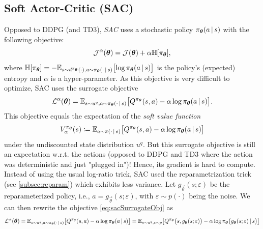 		\subsection{Soft Actor-Critic (\acs{SAC})}
			Opposed to \ac{DDPG} (and \ac{TD3}), \emph{\ac{SAC}} uses a stochastic policy \(\pi_{\bm{\theta}}(a \,\vert\, s)\) with the following objective:
			\begin{equation}
				\mathcal{J}^\alpha(\bm{\theta}) = \mathcal{J}(\bm{\theta}) + \alpha \mathbb{H}[\pi_{\bm{\theta}}],
			\end{equation}
			where \( \mathbb{H}[\pi_{\bm{\theta}}] = -\mathbb{E}_{s \sim d^{\pi_{\bm{\theta}}}(\cdot), a \sim \pi_{\bm{\theta}}(\cdot \,\vert\, s)}\bigl[ \log \pi_{\bm{\theta}}(a \,\vert\, s) \bigr] \) is the policy's (expected) entropy and \(\alpha\) is a hyper-parameter. As this objective is very difficult to optimize, \ac{SAC} uses the surrogate objective
			\begin{equation}
				\mathcal{L}^\alpha(\bm{\theta}) = \mathbb{E}_{s \sim u^q, a \sim \pi_{\bm{\theta}}(\cdot \,\vert\, s)}\bigl[ Q^{\pi_{\bm{\theta}}}(s, a) - \alpha \log \pi_{\bm{\theta}}(a \,\vert\, s) \bigr].  \label{eq:sacSurrogateObj}
			\end{equation}
			This objective equals the expectation of the \emph{soft value function}
			\begin{equation}
				V^{\pi_{\bm{\theta}}}_\alpha(s) \coloneqq \mathbb{E}_{a \sim \pi(\cdot \,\vert\, s)}\bigl[ Q^{\pi_{\bm{\theta}}}(s, a) - \alpha \log \pi_{\bm{\theta}}(a \,\vert\, s) \bigr]
			\end{equation}
			under the undiscounted state distribution \(u^q\). But this surrogate objective is still an expectation w.r.t. the actions (opposed to \ac{DDPG} and \ac{TD3} where the action was deterministic and just "plugged in")! Hence, its gradient is hard to compute. Instead of using the usual log-ratio trick, \ac{SAC} used the reparametrization trick (see \autoref{subsec:reparam}) which exhibits less variance. Let \( g_{\vec{\theta}}(s; \varepsilon) \) be the reparameterized policy, i.e., \( a = g_{\vec{\theta}}(s; \varepsilon) \), with \( \varepsilon \sim p(\cdot) \) being the noise. We can then rewrite the objective \eqref{eq:sacSurrogateObj} as
			\begin{equation}
				\mathcal{L}^\alpha(\bm{\theta})
					= \mathbb{E}_{s \sim u^q, a \sim \pi_{\bm{\theta}}(\cdot \,\vert\, s)}\bigl[ Q^{\pi_{\bm{\theta}}}(s, a) - \alpha \log \pi_{\bm{\theta}}(a \,\vert\, s) \bigr]
					= \mathbb{E}_{s \sim u^q, \varepsilon \sim p}\bigl[ Q^{\pi_{\bm{\theta}}}\bigl(s, g_{\bm{\theta}}(s; \varepsilon)\bigr) - \alpha \log \pi_{\bm{\theta}}\bigl( g_{\bm{\theta}}(s; \varepsilon) \,\vert\, s \bigr) \bigr]
				\label{eq:sacObj}
			\end{equation}

